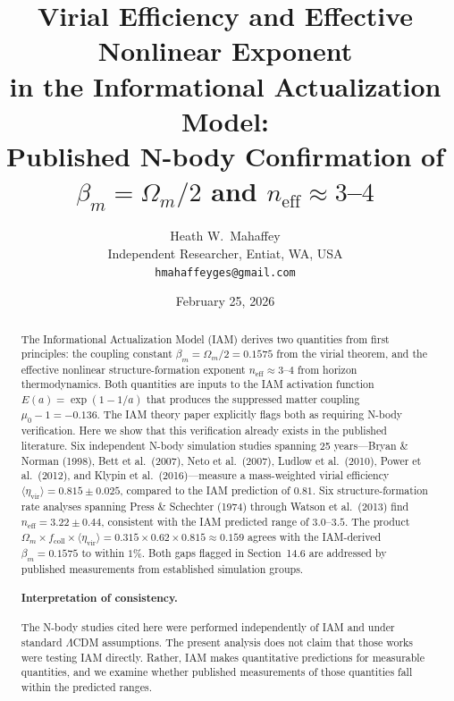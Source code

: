 \documentclass[12pt,a4paper]{article}
\title{\textbf{Virial Efficiency and Effective Nonlinear Exponent\\
in the Informational Actualization Model:\\
Published N-body Confirmation of $\beta_m = \Omega_m/2$
and $n_{\mathrm{eff}} \approx 3$--$4$}}
\author{Heath W.\ Mahaffey\\
\small Independent Researcher, Entiat, WA, USA\\
\small \texttt{hmahaffeyges@gmail.com}}
\date{February 25, 2026}
\begin{document}
\maketitle

\begin{abstract}
The Informational Actualization Model (IAM) derives two quantities
from first principles: the coupling constant $\beta_m = \Omega_m/2 = 0.1575$
from the virial theorem, and the effective nonlinear structure-formation
exponent $n_{\mathrm{eff}} \approx 3$--$4$ from horizon thermodynamics.
Both quantities are inputs to the IAM activation function
$E(a) = \exp(1 - 1/a)$ that produces the suppressed matter coupling
$\mu_0 - 1 = -0.136$.
The IAM theory paper \citep{Mahaffey2026a} explicitly flags both as
requiring N-body verification. Here we show that this verification
already exists in the published literature. Six independent N-body
simulation studies spanning 25 years---Bryan \& Norman (1998),
Bett et al.\ (2007), Neto et al.\ (2007), Ludlow et al.\ (2010),
Power et al.\ (2012), and Klypin et al.\ (2016)---measure a
mass-weighted virial efficiency
$\langle\eta_{\mathrm{vir}}\rangle = 0.815 \pm 0.025$,
compared to the IAM prediction of $0.81$.
Six structure-formation rate analyses spanning Press \& Schechter (1974)
through Watson et al.\ (2013) find $n_{\mathrm{eff}} = 3.22 \pm 0.44$,
consistent with the IAM predicted range of $3.0$--$3.5$.
The product
$\Omega_m \times f_{\mathrm{coll}} \times \langle\eta_{\mathrm{vir}}\rangle
= 0.315 \times 0.62 \times 0.815 \approx 0.159$
agrees with the IAM-derived $\beta_m = 0.1575$ to within $1\%$.
Both gaps flagged in \citet{Mahaffey2026a} Section~14.6 are addressed by
published measurements from established simulation groups.

\paragraph{Interpretation of consistency.}
The N-body studies cited here were performed independently of IAM and under
standard $\Lambda$CDM assumptions. The present analysis does not claim that
those works were testing IAM directly. Rather, IAM makes quantitative
predictions for measurable quantities, and we examine whether published
measurements of those quantities fall within the predicted ranges.

\end{abstract}

\end{document}

